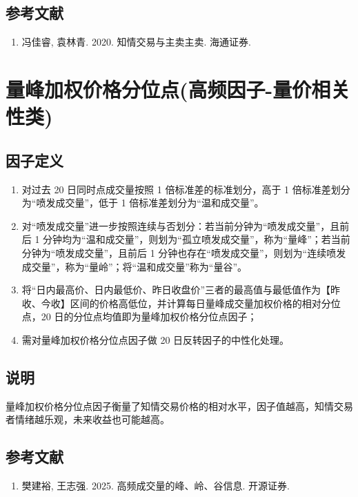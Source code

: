 \documentclass{article}
\begin{document}
\subsection{参考文献}
\begin{enumerate}
    \item 冯佳睿, 袁林青. 2020. 知情交易与主卖主卖. 海通证券.
\end{enumerate}

\section{量峰加权价格分位点(高频因子-量价相关性类)}

\subsection{因子定义}
\begin{enumerate}
    \item 对过去 20 日同时点成交量按照 1 倍标准差的标准划分，高于 1 倍标准差划分为“喷发成交量”，低于 1 倍标准差划分为“温和成交量”。
    \item 对“喷发成交量”进一步按照连续与否划分：若当前分钟为“喷发成交量”，且前后 1 分钟均为“温和成交量”，则划为“孤立喷发成交量”，称为“量峰”；若当前分钟为“喷发成交量”，且前后 1 分钟也存在“喷发成交量”，则划为“连续喷发成交量”，称为“量岭”；将“温和成交量”称为“量谷”。
    \item 将“日内最高价、日内最低价、昨日收盘价”三者的最高值与最低值作为【昨收、今收】区间的价格高低位，并计算每日量峰成交量加权价格的相对分位点，20 日的分位点均值即为量峰加权价格分位点因子；
    \item 需对量峰加权价格分位点因子做 20 日反转因子的中性化处理。
\end{enumerate}

\subsection{说明}
量峰加权价格分位点因子衡量了知情交易价格的相对水平，因子值越高，知情交易者情绪越乐观，未来收益也可能越高。

\subsection{参考文献}
\begin{enumerate}
    \item 樊建裕, 王志强. 2025. 高频成交量的峰、岭、谷信息. 开源证券.
\end{enumerate}
\end{document}
